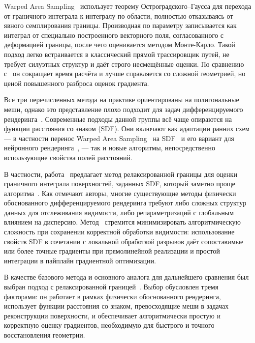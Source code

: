 Warped Area Sampling~\cite{WAS2020} использует теорему Остроградского--Гаусса
для перехода от граничного интеграла к интегралу по области, полностью
отказываясь от явного семплирования границы. Производная по параметру
записывается как интеграл от специально построенного векторного поля,
согласованного с деформацией границы, после чего оценивается методом
Монте-Карло. Такой подход легко встраивается в классический прямой трассировщик
путей, не требует силуэтных структур и даёт строго несмещённые оценки. По
сравнению с~\cite{ES2018} он сокращает время расчёта и лучше справляется со
сложной геометрией, но ценой повышенного разброса оценок градиента.

Все три перечисленных метода на практике ориентированы на полигональные меши,
однако это представление плохо подходит для задач дифференцируемого
рендеринга~\cite{Nicolet}. Современные подходы данной группы всё чаще опираются
на функции расстояния со знаком (SDF). Они включают как адаптации ранних схем ---
в частности перенос Warped Area Sampling~\cite{WAS2020} на SDF~\cite{WASSDF2022}
и его вариант для нейронного рендеринга~\cite{DSDF2022}, --- так и новые
алгоритмы, непосредственно использующие свойства полей расстояний.

В частности, работа~\cite{Relax2024} предлагает метод релаксированной границы
для оценки граничного интеграла поверхностей, заданных SDF, который заметно
проще алгоритма~\cite{WASSDF2022}. Как отмечают авторы, многие существующие
методы физически обоснованного дифференцируемого рендеринга требуют либо сложных
структур данных для отслеживания видимости, либо репараметризаций с глобальным
влиянием на дисперсию. Метод~\cite{Relax2024} стремится минимизировать
алгоритмическую сложность при сохранении корректной обработки видимости:
использование свойств SDF в сочетании с локальной обработкой разрывов даёт
сопоставимые или более точные градиенты при прямолинейной реализации и простой
интеграции в пайплайн градиентной оптимизации.

В качестве базового метода и основного аналога для дальнейшего сравнения был
выбран подход с релаксированной границей~\cite{Relax2024}. Выбор обусловлен
тремя факторами: он работает в рамках физически обоснованного рендеринга,
использует функции расстояния со знаком, превосходящие меши в задачах
реконструкции поверхности, и обеспечивает алгоритмически простую и корректную
оценку градиентов, необходимую для быстрого и точного восстановления геометрии.


\endinput

